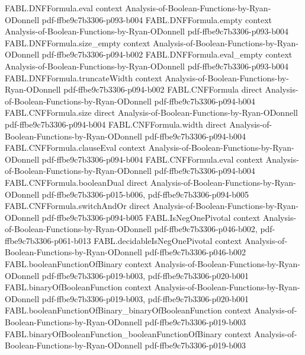 \begin{theorem}
\proofstep
  {FABL.DNFFormula.eval}
  {context}
  {Analysis-of-Boolean-Functions-by-Ryan-ODonnell}
  {pdf-ffbe9c7b3306-p093-b004}
\proofstep
  {FABL.DNFFormula.empty}
  {context}
  {Analysis-of-Boolean-Functions-by-Ryan-ODonnell}
  {pdf-ffbe9c7b3306-p093-b004}
\proofstep
  {FABL.DNFFormula.size_empty}
  {context}
  {Analysis-of-Boolean-Functions-by-Ryan-ODonnell}
  {pdf-ffbe9c7b3306-p094-b002}
\proofstep
  {FABL.DNFFormula.eval_empty}
  {context}
  {Analysis-of-Boolean-Functions-by-Ryan-ODonnell}
  {pdf-ffbe9c7b3306-p093-b004}
\proofstep
  {FABL.DNFFormula.truncateWidth}
  {context}
  {Analysis-of-Boolean-Functions-by-Ryan-ODonnell}
  {pdf-ffbe9c7b3306-p094-b002}
\proofstep
  {FABL.CNFFormula}
  {direct}
  {Analysis-of-Boolean-Functions-by-Ryan-ODonnell}
  {pdf-ffbe9c7b3306-p094-b004}
\proofstep
  {FABL.CNFFormula.size}
  {direct}
  {Analysis-of-Boolean-Functions-by-Ryan-ODonnell}
  {pdf-ffbe9c7b3306-p094-b004}
\proofstep
  {FABL.CNFFormula.width}
  {direct}
  {Analysis-of-Boolean-Functions-by-Ryan-ODonnell}
  {pdf-ffbe9c7b3306-p094-b004}
\proofstep
  {FABL.CNFFormula.clauseEval}
  {context}
  {Analysis-of-Boolean-Functions-by-Ryan-ODonnell}
  {pdf-ffbe9c7b3306-p094-b004}
\proofstep
  {FABL.CNFFormula.eval}
  {context}
  {Analysis-of-Boolean-Functions-by-Ryan-ODonnell}
  {pdf-ffbe9c7b3306-p094-b004}
\proofstep
  {FABL.CNFFormula.booleanDual}
  {direct}
  {Analysis-of-Boolean-Functions-by-Ryan-ODonnell}
  {pdf-ffbe9c7b3306-p015-b006,
    pdf-ffbe9c7b3306-p094-b005}
\proofstep
  {FABL.CNFFormula.switchAndOr}
  {direct}
  {Analysis-of-Boolean-Functions-by-Ryan-ODonnell}
  {pdf-ffbe9c7b3306-p094-b005}
\proofstep
  {FABL.IsNegOnePivotal}
  {context}
  {Analysis-of-Boolean-Functions-by-Ryan-ODonnell}
  {pdf-ffbe9c7b3306-p046-b002,
    pdf-ffbe9c7b3306-p061-b013}
\proofstep
  {FABL.decidableIsNegOnePivotal}
  {context}
  {Analysis-of-Boolean-Functions-by-Ryan-ODonnell}
  {pdf-ffbe9c7b3306-p046-b002}
\proofstep
  {FABL.booleanFunctionOfBinary}
  {context}
  {Analysis-of-Boolean-Functions-by-Ryan-ODonnell}
  {pdf-ffbe9c7b3306-p019-b003,
    pdf-ffbe9c7b3306-p020-b001}
\proofstep
  {FABL.binaryOfBooleanFunction}
  {context}
  {Analysis-of-Boolean-Functions-by-Ryan-ODonnell}
  {pdf-ffbe9c7b3306-p019-b003,
    pdf-ffbe9c7b3306-p020-b001}
\proofstep
  {FABL.booleanFunctionOfBinary_binaryOfBooleanFunction}
  {context}
  {Analysis-of-Boolean-Functions-by-Ryan-ODonnell}
  {pdf-ffbe9c7b3306-p019-b003}
\proofstep
  {FABL.binaryOfBooleanFunction_booleanFunctionOfBinary}
  {context}
  {Analysis-of-Boolean-Functions-by-Ryan-ODonnell}
  {pdf-ffbe9c7b3306-p019-b003}
\proofstep

\end{theorem}
